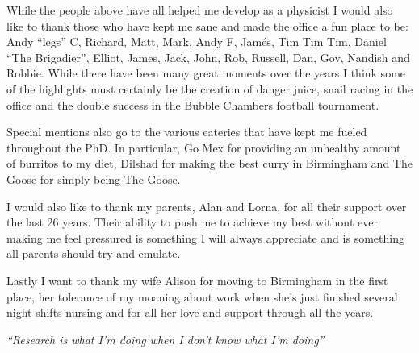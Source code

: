 While the people above have all helped me develop as a physicist I would also like to thank those who have kept me sane and made the office a fun place to be: Andy ``legs'' C, Richard, Matt, Mark, Andy F, Jam\'{e}s, Tim Tim Tim, Daniel ``The Brigadier'', Elliot, James, Jack, John, Rob, Russell, Dan, Gov, Nandish and Robbie. While there have been many great moments over the years I think some of the highlights must certainly be the creation of danger juice, snail racing in the office and the double success in the Bubble Chambers football tournament. 

Special mentions also go to the various eateries that have kept me fueled throughout the PhD. In particular, Go Mex for providing an unhealthy amount of burritos to my diet, Dilshad for making the best curry in Birmingham and The Goose for simply being The Goose.

I would also like to thank my parents, Alan and Lorna, for all their support over the last 26 years. Their ability to push me to achieve my best without ever making me feel pressured is something I will always appreciate and is something all parents should try and emulate. 

Lastly I want to thank my wife Alison for moving to Birmingham in the first place, her tolerance of my moaning about work when she's just finished several night shifts nursing and for all her love and support through all the years. 
%
\cleardoublepage
~
\vspace*{\fill}
\begin{center}
  \emph{``Research is what I'm doing when I don't know what I'm doing''}
\end{center}
\vspace*{\fill}
\cleardoublepage
